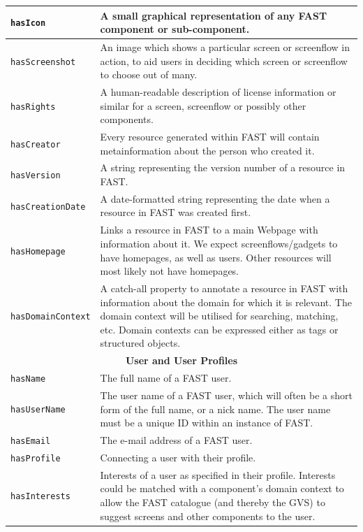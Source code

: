 \documentclass{fast_latex}
\begin{document}
\begin{small}
\begin{longtable}{|p{3.25cm}|p{11cm}|}
\texttt{hasIcon} & A small graphical representation of any FAST component or sub-component. \\ \hline
\texttt{hasScreenshot} & An image which shows a particular screen or screenflow in action, to aid users in deciding which screen or screenflow to choose out of many. \\ \hline
\texttt{hasRights} & A human-readable description of license information or similar for a screen, screenflow or possibly other components. \\ \hline
\texttt{hasCreator} & Every resource generated within FAST will contain metainformation about the person who created it. \\ \hline
\texttt{hasVersion} & A string representing the version number of a resource in FAST. \\ \hline
\texttt{hasCreationDate} & A date-formatted string representing the date when a resource in FAST was created first. \\ \hline
\texttt{hasHomepage} & Links a resource in FAST to a main Webpage with information about it. We expect screenflows/gadgets to have homepages, as well as users. Other resources will most likely not have homepages. \\ \hline
\texttt{hasDomainContext} & A catch-all property to annotate a resource in FAST with information about the domain for which it is relevant. The domain context will be utilised for searching, matching, etc. Domain contexts can be expressed either as tags or structured objects. \\ \hline
\multicolumn{2}{|c|}{\textbf{User and User Profiles}} \\ \hline
\texttt{hasName} & The full name of a FAST user. \\ \hline
\texttt{hasUserName} & The user name of a FAST user, which will often be a short form of the full name, or a nick name. The user name must be a unique ID within an instance of FAST. \\ \hline
\texttt{hasEmail} & The e-mail address of a FAST user. \\ \hline
\texttt{hasProfile} & Connecting a user with their profile. \\ \hline
\texttt{hasInterests} & Interests of a user as specified in their profile. Interests could be matched with a component's domain context to allow the FAST catalogue (and thereby the GVS) to suggest screens and other components to the user. \\ \hline
\end{longtable}
\end{small}
\doublespacing
\end{document}
